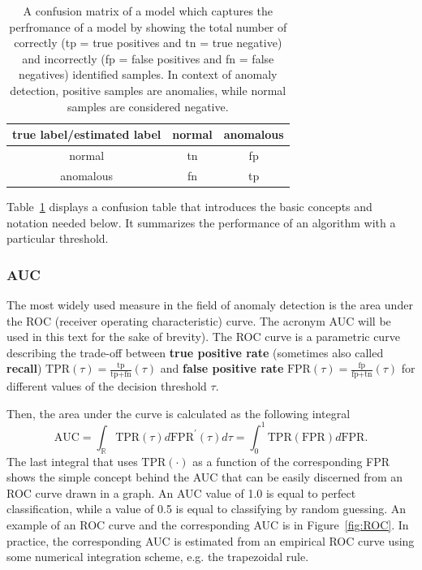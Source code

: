 \begin{table}
\centering
	\begin{tabular}{c | c c}
		true label/estimated label & normal & anomalous \\
		\hline
		normal & tn & fp  \\
		anomalous & fn & tp 
	\end{tabular}
	\caption{A confusion matrix of a model which captures the perfromance of a model by showing the total number of correctly (tp = true positives and tn = true negative) and incorrectly (fp = false positives and fn = false negatives) identified samples. In context of anomaly detection, positive samples are anomalies, while normal samples are considered negative.}
	\label{tab:conf_ex}
\end{table}
Table~\ref{tab:conf_ex} displays a confusion table that introduces the basic concepts and notation needed below. It summarizes the performance of an algorithm with a particular threshold.

\subsubsection{AUC}
The most widely used measure in the field of anomaly detection is the area under the ROC (receiver operating characteristic) curve. The acronym AUC will be used in this text for the sake of brevity). The ROC curve is a parametric curve describing the trade-off between \textbf{true positive rate} (sometimes also called \textbf{recall}) $\text{TPR}(\tau) = \frac{\text{tp}}{\text{tp+fn}}(\tau)$ and \textbf{false positive rate} $\text{FPR}(\tau) = \frac{\text{fp}}{\text{fp+tn}}(\tau)$ for different values of the decision threshold $\tau$. 

Then, the area under the curve is calculated as the following integral
\begin{equation} \label{eq:auc}
\text{AUC}=\int_{\mathbb{R}}\text{TPR}(\tau)d\text{FPR}^{\prime}(\tau)d\tau = \int_0^1\text{TPR}(\text{FPR})d\text{FPR}.
\end{equation}
The last integral that uses $\text{TPR}(\cdot)$ as a function of the corresponding FPR shows the simple concept behind the AUC that can be easily discerned from an ROC curve drawn in a graph. An AUC value of 1.0 is equal to perfect classification, while a value of 0.5 is equal to classifying by random guessing. An example of an ROC curve and the corresponding AUC is in Figure~\ref{fig:ROC}. In practice, the corresponding AUC is estimated from an empirical ROC curve using some numerical integration scheme, e.g. the trapezoidal rule.

